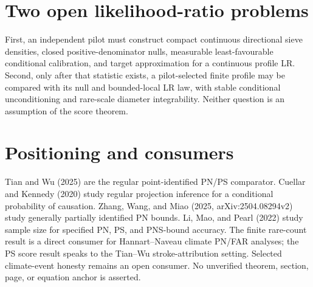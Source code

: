 \documentclass{article}
\begin{document}
\section{Two open likelihood-ratio problems}
First, an independent pilot must construct compact continuous directional
sieve densities, closed positive-denominator nulls, measurable
least-favourable conditional calibration, and target approximation for a
continuous profile LR.  Second, only after that statistic exists, a
pilot-selected finite profile may be compared with its null and bounded-local
LR law, with stable conditional unconditioning and rare-scale diameter
integrability.  Neither question is an assumption of the score theorem.

\section{Positioning and consumers}
Tian and Wu (2025) are the regular point-identified PN/PS comparator.
Cuellar and Kennedy (2020) study regular projection inference for a
conditional probability of causation.  Zhang, Wang, and Miao (2025,
arXiv:2504.08294v2) study generally partially identified PN bounds.  Li,
Mao, and Pearl (2022) study sample size for specified PN, PS, and PNS-bound
accuracy.  The finite rare-count result is a direct consumer for
Hannart--Naveau climate PN/FAR analyses; the PS score result speaks to the
Tian--Wu stroke-attribution setting.  Selected climate-event honesty remains
an open consumer.  No unverified theorem, section, page, or equation anchor
is asserted.
\end{document}
